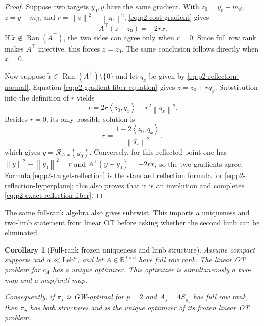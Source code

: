 \documentclass[11pt,a4paper]{article}
\newtheorem{corollary}[theorem]{Corollary}
\theoremstyle{definition}
\theoremstyle{remark}
\newcommand{\R}{\mathbb R}
\newcommand{\Ran}{\operatorname{Ran}}
\newcommand{\norm}[1]{\left\lVert #1\right\rVert}
\newcommand{\ip}[2]{\left\langle #1,#2\right\rangle}
\begin{document}
\begin{proof}
Suppose two targets \(y_0,y\) have the same gradient.  With
\(z_0=y_0-m_\beta\), \(z=y-m_\beta\), and
\(r=\norm{z}^2-\norm{z_0}^2\), \eqref{eq:p2-cost-gradient} gives
\begin{equation}
  A^\top(z-z_0)=-2r\widetilde x.
  \label{eq:p2-gradient-fiber-equation}
\end{equation}
If \(\widetilde x\notin\Ran(A^\top)\), the two sides can agree only when
\(r=0\).  Since full row rank makes \(A^\top\) injective, this forces
\(z=z_0\).  The same conclusion follows directly when \(\widetilde x=0\).

Now suppose \(\widetilde x\in\Ran(A^\top)\setminus\{0\}\) and let \(q_x\)
be given by \eqref{eq:p2-reflection-normal}.  Equation
\eqref{eq:p2-gradient-fiber-equation} gives \(z=z_0+rq_x\).  Substitution into
the definition of \(r\) yields
\[
  r=2r\ip{z_0}{q_x}+r^2\norm{q_x}^2.
\]
Besides \(r=0\), its only possible solution is
\begin{equation*}
  r=\frac{1-2\ip{z_0}{q_x}}{\norm{q_x}^2},
\end{equation*}
which gives \(y=\mathscr R_{A,x}(y_0)\).  Conversely, for this reflected
point one has
\(
 \norm{\widetilde y}^2-\norm{\widetilde y_0}^2=r
\)
and \(A^\top(\widetilde y-\widetilde y_0)=-2r\widetilde x\), so the two
gradients agree.  Formula \eqref{eq:p2-target-reflection} is the standard
reflection formula for \eqref{eq:p2-reflection-hyperplane}; this also proves
that it is an involution and completes \eqref{eq:p2-exact-reflection-fiber}.
\end{proof}

The same full-rank algebra also gives subtwist.  This imports a uniqueness and
two-limb statement from linear OT before asking whether the second limb can be
eliminated.

\begin{corollary}[Full-rank frozen uniqueness and limb structure]
\label{cor:p2-full-rank-subtwist}
Assume compact supports and \(\alpha\ll\mathrm{Leb}^n\), and let
\(A\in\R^{d\times n}\) have full row rank.  The linear OT problem for
\(c_A\) has a unique optimizer.  This optimizer is simultaneously a two-map
and a map/anti-map.

Consequently, if \(\pi_\star\) is GW-optimal for \(p=2\) and
\(A_\star=4S_{\pi_\star}\) has full row rank, then \(\pi_\star\) has both
structures and is the unique optimizer of its frozen linear OT problem.
\end{corollary}
\end{document}
